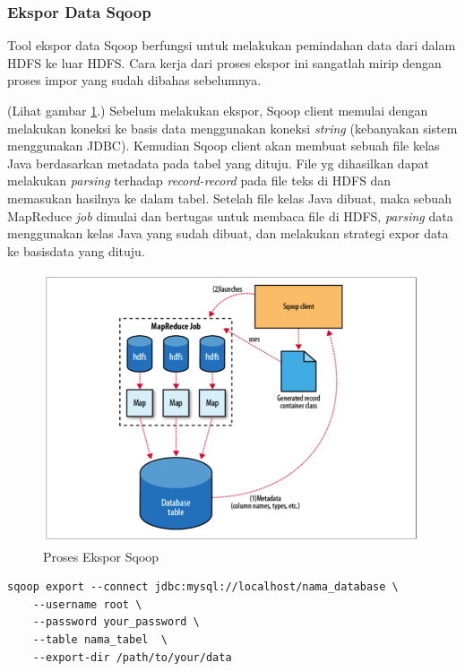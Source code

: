 \subsubsection{Ekspor Data Sqoop}
\label{sec:ekspor_data_sqoop}
Tool ekspor data Sqoop berfungsi untuk melakukan pemindahan data dari dalam HDFS ke luar HDFS. Cara kerja dari proses ekspor ini sangatlah mirip dengan proses impor yang sudah dibahas sebelumnya. 

(Lihat gambar \ref{fig:sqoop_ekspor}.) Sebelum melakukan ekspor, Sqoop client memulai dengan melakukan koneksi ke basis data menggunakan koneksi \textit{string} (kebanyakan sistem menggunakan JDBC). Kemudian Sqoop client akan membuat sebuah file kelas Java berdasarkan metadata pada tabel yang dituju. File yg dihasilkan dapat melakukan \textit{parsing} terhadap \textit{record-record} pada file teks di HDFS dan memasukan hasilnya ke dalam tabel. Setelah file kelas Java dibuat, maka sebuah MapReduce \textit{job} dimulai dan bertugas untuk membaca file di HDFS, \textit{parsing} data menggunakan kelas Java yang sudah dibuat, dan melakukan strategi expor data ke basisdata yang dituju.

\begin{figure}
	\centering
	\includegraphics[scale=0.5]{Gambar/sqoop-export.png}
	\caption[Proses Ekspor Sqoop]{Proses Ekspor Sqoop \cite{white2012hadoop}} 
	\label{fig:sqoop_ekspor}
\end{figure}

\begin{lstlisting}[caption=Perintah Ekspor Sqoop dari HDFS ke Basis Data MySQL]
	sqoop export --connect jdbc:mysql://localhost/nama_database \
	--username root \
	--password your_password \
	--table nama_tabel  \
	--export-dir /path/to/your/data
\end{lstlisting}

